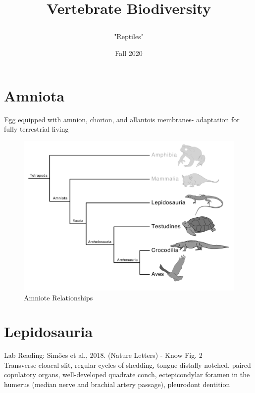 \documentclass[a4paper,12pt]{article}
\begin{document}
\title{Vertebrate Biodiversity
\author{"Reptiles"
\date{Fall 2020}
}}
\maketitle

%
%


\section{Amniota}
Egg equipped with amnion, chorion, and allantois membranes- adaptation for fully terrestrial living

\begin{figure}[H]
\centering
  \includegraphics[scale=0.3]{Amniota_tre.pdf}
  \caption{Amniote Relationships}
  \label{fig:Amniota}
\end{figure}


\section{Lepidosauria}
Lab Reading: Simões et al., 2018. (Nature Letters) - Know Fig. 2 \\
Transverse cloacal slit, regular cycles of shedding, tongue distally notched, paired copulatory organs, well-developed quadrate conch, ectepicondylar foramen in the humerus (median nerve and brachial artery passage), pleurodont dentition
\end{document}
